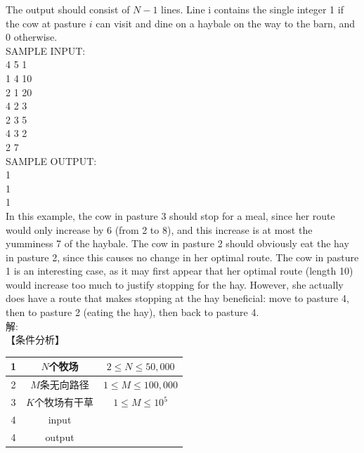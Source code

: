 \documentclass[12pt,twiside,a4paper]{ctexbook}
\numberwithin{chapter}{part}
\begin{document}
The output should consist of $N−1$ lines. Line i contains the single integer 1 if the cow at pasture $i$ can visit and dine on a haybale on the way to the barn, and 0 otherwise.\\
SAMPLE INPUT:\\
4 5 1\\
1 4 10\\
2 1 20\\
4 2 3\\
2 3 5\\
4 3 2\\
2 7\\
SAMPLE OUTPUT:\\
1\\
1\\
1\\
In this example, the cow in pasture 3 should stop for a meal, since her route would only increase by 6 (from 2 to 8), and this increase is at most the yumminess 7 of the haybale. The cow in pasture 2 should obviously eat the hay in pasture 2, since this causes no change in her optimal route. The cow in pasture 1 is an interesting case, as it may first appear that her optimal route (length 10) would increase too much to justify stopping for the hay. However, she actually does have a route that makes stopping at the hay beneficial: move to pasture 4, then to pasture 2 (eating the hay), then back to pasture 4.\\
解:\\
【条件分析】\\
\begin{tabular}{|c|c|c|}
\hline
1 & $N$个牧场 & $2\leq N\leq 50,000$\\
\hline
2 & $M$条无向路径 & $1\leq M\leq 100,000$\\
\hline
3 & $K$个牧场有干草 & $1\leq M\leq 10^5$\\
\hline
4 & input & \\
\hline
4 & output & \\
\hline
\end{tabular}
\end{document}
